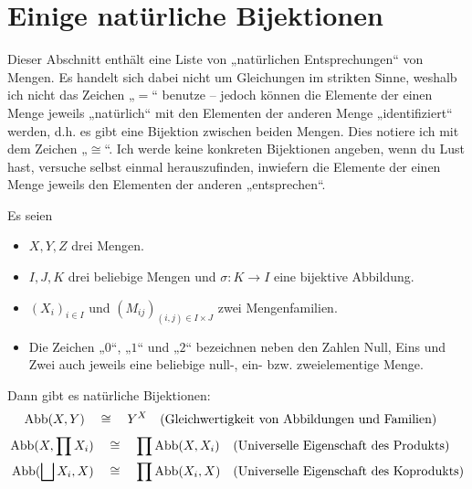 \section{Einige natürliche Bijektionen}
Dieser Abschnitt enthält eine Liste von „natürlichen Entsprechungen“ von Mengen. Es handelt sich dabei nicht um Gleichungen im strikten Sinne, weshalb ich nicht das Zeichen „$=$“ benutze -- jedoch können die Elemente der einen Menge jeweils „natürlich“ mit den Elementen der anderen Menge „identifiziert“ werden, d.h. es gibt eine Bijektion zwischen beiden Mengen. Dies notiere ich mit dem Zeichen „$\cong$“. Ich werde keine konkreten Bijektionen angeben, wenn du Lust hast, versuche selbst einmal herauszufinden, inwiefern die Elemente der einen Menge jeweils den Elementen der anderen „entsprechen“.

Es seien
\begin{itemize}
    \item $X,Y,Z$ drei Mengen.
    \item $I,J,K$ drei beliebige Mengen und $\sigma : K\to I$ eine bijektive Abbildung.
    \item $(X_i)_{i\in I}$ und $(M_{ij})_{(i,j)\in I\times J}$ zwei Mengenfamilien.
    \item Die Zeichen „$0$“, „$1$“ und „$2$“ bezeichnen neben den Zahlen Null, Eins und Zwei auch jeweils eine beliebige null-, ein- bzw. zweielementige Menge.
\end{itemize}
Dann gibt es natürliche Bijektionen:
\begingroup
\allowdisplaybreaks
\begin{align*}
    \operatorname{Abb}(X,Y) & \quad\cong\quad Y^X && (\text{Gleichwertigkeit von Abbildungen und Familien})
\end{align*}
\begin{align*}
    \operatorname{Abb}(X,\prod X_i) & \quad\cong\quad \prod \operatorname{Abb}(X,X_i) && (\text{Universelle Eigenschaft des Produkts}) \\
    \operatorname{Abb}(\bigsqcup X_i,X) & \quad\cong\quad \prod \operatorname{Abb}(X_i,X) && (\text{Universelle Eigenschaft des Koprodukts})
\end{align*}

